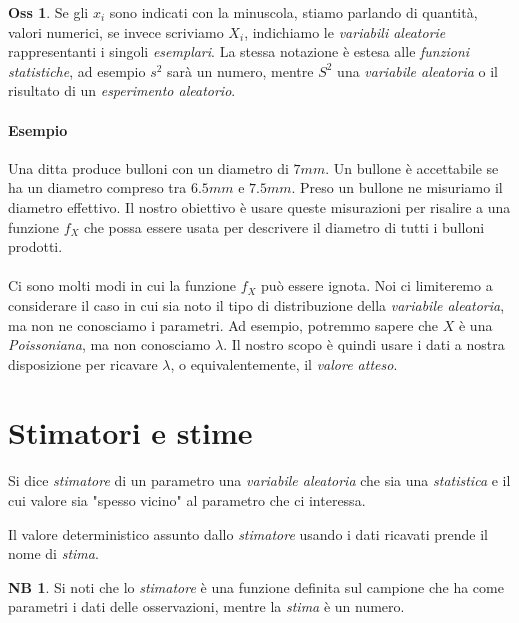 \documentclass[12pt, a4paper]{report}
\theoremstyle{definition}
\newtheorem*{observation}{Oss}
\newtheorem*{note}{NB}
\begin{document}
\begin{observation}
	Se gli $x_i$ sono indicati con la minuscola, stiamo parlando di quantità,
	valori numerici, se invece scriviamo $X_i$, indichiamo le \emph{variabili
	aleatorie} rappresentanti i singoli \emph{esemplari}. La stessa notazione è
	estesa alle \emph{funzioni statistiche}, ad esempio $s^2$ sarà un numero,
	mentre $S^2$ una \emph{variabile aleatoria} o il risultato di un
	\emph{esperimento aleatorio}.
\end{observation}

\paragraph{Esempio}
Una ditta produce bulloni con un diametro di $7mm$. Un bullone è accettabile se
ha un diametro compreso tra $6.5mm$ e $7.5mm$.  Preso un bullone ne misuriamo il
diametro effettivo. Il nostro obiettivo è usare queste misurazioni per risalire
a una funzione $f_X$ che possa essere usata per descrivere il diametro di tutti
i bulloni prodotti.

\paragraph{}
Ci sono molti modi in cui la funzione $f_X$ può essere ignota. Noi ci limiteremo
a considerare il caso in cui sia noto il tipo di distribuzione della \emph{variabile
aleatoria}, ma non ne conosciamo i parametri. Ad esempio, potremmo sapere che $X$
è una \emph{Poissoniana}, ma non conosciamo $\lambda$. Il nostro scopo è quindi
usare i dati a nostra disposizione per ricavare $\lambda$, o equivalentemente,
il \emph{valore atteso}.

\section{Stimatori e stime}
Si dice \emph{stimatore} di un parametro una \emph{variabile aleatoria} che sia
una \emph{statistica} e il cui valore sia "spesso vicino" al parametro che ci
interessa.

Il valore deterministico assunto dallo \emph{stimatore} usando i dati ricavati
prende il nome di \emph{stima}.

\begin{note}
	Si noti che lo \emph{stimatore} è una funzione definita sul campione che ha
	come parametri i dati delle osservazioni, mentre la \emph{stima} è un numero.
\end{note}
\end{document}
